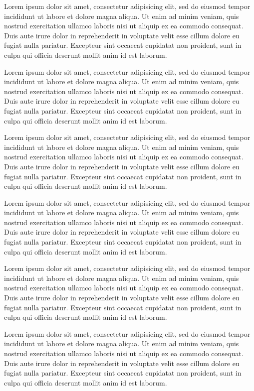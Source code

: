 \documentclass[10pt,a4paper,extrafontsizes,oldfontcommands,oneside]{memoir}
\begin{document}
Lorem ipsum dolor sit amet, consectetur adipisicing elit, sed do eiusmod tempor incididunt ut labore et dolore magna aliqua. Ut enim ad minim veniam, quis nostrud exercitation ullamco laboris nisi ut aliquip ex ea commodo consequat. Duis aute irure dolor in reprehenderit in voluptate velit esse cillum dolore eu fugiat nulla pariatur. Excepteur sint occaecat cupidatat non proident, sunt in culpa qui officia deserunt mollit anim id est laborum.

Lorem ipsum dolor sit amet, consectetur adipisicing elit, sed do eiusmod tempor incididunt ut labore et dolore magna aliqua. Ut enim ad minim veniam, quis nostrud exercitation ullamco laboris nisi ut aliquip ex ea commodo consequat. Duis aute irure dolor in reprehenderit in voluptate velit esse cillum dolore eu fugiat nulla pariatur. Excepteur sint occaecat cupidatat non proident, sunt in culpa qui officia deserunt mollit anim id est laborum.

Lorem ipsum dolor sit amet, consectetur adipisicing elit, sed do eiusmod tempor incididunt ut labore et dolore magna aliqua. Ut enim ad minim veniam, quis nostrud exercitation ullamco laboris nisi ut aliquip ex ea commodo consequat. Duis aute irure dolor in reprehenderit in voluptate velit esse cillum dolore eu fugiat nulla pariatur. Excepteur sint occaecat cupidatat non proident, sunt in culpa qui officia deserunt mollit anim id est laborum.

Lorem ipsum dolor sit amet, consectetur adipisicing elit, sed do eiusmod tempor incididunt ut labore et dolore magna aliqua. Ut enim ad minim veniam, quis nostrud exercitation ullamco laboris nisi ut aliquip ex ea commodo consequat. Duis aute irure dolor in reprehenderit in voluptate velit esse cillum dolore eu fugiat nulla pariatur. Excepteur sint occaecat cupidatat non proident, sunt in culpa qui officia deserunt mollit anim id est laborum.

Lorem ipsum dolor sit amet, consectetur adipisicing elit, sed do eiusmod tempor incididunt ut labore et dolore magna aliqua. Ut enim ad minim veniam, quis nostrud exercitation ullamco laboris nisi ut aliquip ex ea commodo consequat. Duis aute irure dolor in reprehenderit in voluptate velit esse cillum dolore eu fugiat nulla pariatur. Excepteur sint occaecat cupidatat non proident, sunt in culpa qui officia deserunt mollit anim id est laborum.

Lorem ipsum dolor sit amet, consectetur adipisicing elit, sed do eiusmod tempor incididunt ut labore et dolore magna aliqua. Ut enim ad minim veniam, quis nostrud exercitation ullamco laboris nisi ut aliquip ex ea commodo consequat. Duis aute irure dolor in reprehenderit in voluptate velit esse cillum dolore eu fugiat nulla pariatur. Excepteur sint occaecat cupidatat non proident, sunt in culpa qui officia deserunt mollit anim id est laborum.
\end{document}
